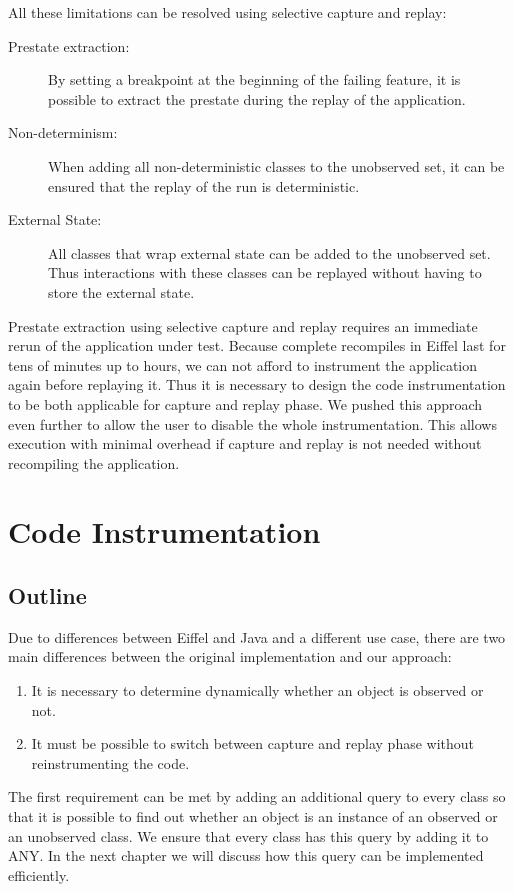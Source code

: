 All these limitations can be resolved using selective capture and replay:
\begin{description}
\item [Prestate extraction:] By setting a breakpoint at the beginning of the failing feature, it is possible to extract the prestate during the replay of the application.
\item [Non-determinism:] When adding all non-deterministic classes to the unobserved set, it can be ensured that the replay of the run is deterministic.
\item [External State:] All classes that wrap external state can be added to the unobserved set. Thus interactions with these classes can be replayed without having to store the external state.
\end{description}

Prestate extraction using selective capture and replay requires an immediate rerun of the application under test. Because complete recompiles in Eiffel last for tens of minutes up to hours, we can not afford to instrument the application again before replaying it. Thus it is necessary to design the code instrumentation to be both applicable for capture and replay phase. We pushed this approach even further to allow the user to disable the whole instrumentation. This allows execution with minimal overhead if capture and replay is not needed without recompiling the application.

\section{Code Instrumentation}
\subsection{Outline}
Due to differences between Eiffel and Java and a different use case, there are two main differences between the original implementation and our approach:

\begin{enumerate}
 \item It is necessary to determine dynamically whether an object is observed or not.
\item It must be possible to switch between capture and replay phase without reinstrumenting the code.
\end{enumerate}

The first requirement can be met by adding an additional query to every class so that it is possible to find out whether an object is an instance of an observed or an unobserved class. We ensure that every class has this query by adding it to ANY. In the next chapter we will discuss how this query can be implemented efficiently.

